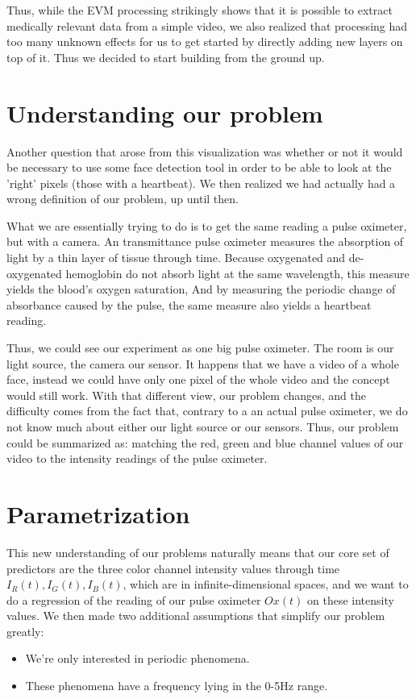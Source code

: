 \documentclass[12pt]{article}
\begin{document}
  Thus, while the EVM processing strikingly shows that it is possible to extract medically relevant data from a simple video, we also realized that processing had too many 
  unknown effects for us to get started by directly adding new layers on top of it. Thus we decided to start building from the ground up.

  \section{Understanding our problem}

  Another question that arose from this visualization was whether or not it would be necessary to use some face detection tool 
  in order to be able to look at the 'right' pixels (those with a heartbeat). We then realized we had actually 
  had a wrong definition of our problem, up until then.

  What we are essentially trying to do is to get the same reading a pulse oximeter, but with a camera.
  An transmittance pulse oximeter measures the absorption of light by a thin layer of 
  tissue through time. Because oxygenated and de-oxygenated hemoglobin do not absorb light 
  at the same wavelength, this measure yields the blood's oxygen saturation, And by measuring the 
  periodic change of absorbance caused by the pulse, the same measure also yields a heartbeat reading.

  Thus, we could see our experiment as one big pulse oximeter. The room is our light source, 
  the camera our sensor. It happens that we have a video of a whole face, instead we could 
  have only one pixel of the whole video and the concept would still work. 
  With that different view, our problem changes, and the difficulty comes from the 
  fact that, contrary to a an actual pulse oximeter, we do not know much about either our light source or our sensors.
  Thus, our problem could be summarized as: matching the red, green and blue channel values of our video to 
  the intensity readings of the pulse oximeter.

\section{Parametrization}
  This new understanding of our problems naturally means that our core set of predictors are the three color channel intensity values through
  time \(I_R(t), I_G(t), I_B(t)\), which are in infinite-dimensional spaces, and we want to do a regression of the reading of our pulse oximeter $Ox(t)$ 
  on these intensity values.
  We then made two additional assumptions that simplify our problem greatly:
  \begin{itemize}
    \item We're only interested in periodic phenomena.
    \item These phenomena have a frequency lying in the 0-5Hz range.
  \end{itemize}
\end{document}
